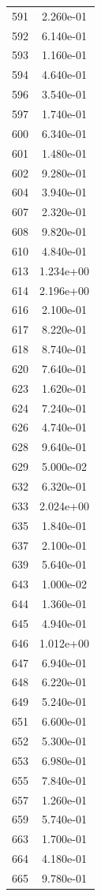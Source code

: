 \documentclass[12pt]{article}
\begin{document}
\begin{longtable}{@{}cc@{}}
591 & 2.260e-01 \\
592 & 6.140e-01 \\
593 & 1.160e-01 \\
594 & 4.640e-01 \\
596 & 3.540e-01 \\
597 & 1.740e-01 \\
600 & 6.340e-01 \\
601 & 1.480e-01 \\
602 & 9.280e-01 \\
604 & 3.940e-01 \\
607 & 2.320e-01 \\
608 & 9.820e-01 \\
610 & 4.840e-01 \\
613 & 1.234e+00 \\
614 & 2.196e+00 \\
616 & 2.100e-01 \\
617 & 8.220e-01 \\
618 & 8.740e-01 \\
620 & 7.640e-01 \\
623 & 1.620e-01 \\
624 & 7.240e-01 \\
626 & 4.740e-01 \\
628 & 9.640e-01 \\
629 & 5.000e-02 \\
632 & 6.320e-01 \\
633 & 2.024e+00 \\
635 & 1.840e-01 \\
637 & 2.100e-01 \\
639 & 5.640e-01 \\
643 & 1.000e-02 \\
644 & 1.360e-01 \\
645 & 4.940e-01 \\
646 & 1.012e+00 \\
647 & 6.940e-01 \\
648 & 6.220e-01 \\
649 & 5.240e-01 \\
651 & 6.600e-01 \\
652 & 5.300e-01 \\
653 & 6.980e-01 \\
655 & 7.840e-01 \\
657 & 1.260e-01 \\
659 & 5.740e-01 \\
663 & 1.700e-01 \\
664 & 4.180e-01 \\
665 & 9.780e-01 \\

\end{longtable}
\end{document}
